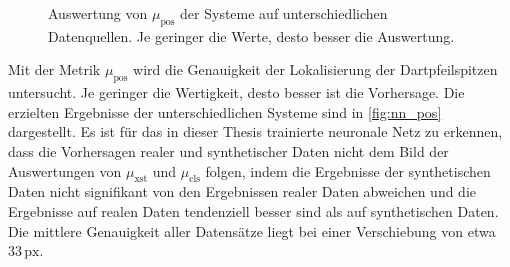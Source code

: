 \begin{figure}
    \centering
    \caption{Auswertung von $\mu_\text{pos}$ der Systeme auf unterschiedlichen Datenquellen. Je geringer die Werte, desto besser die Auswertung.}
    \label{fig:nn_pos}
\end{figure}

Mit der Metrik $\mu_\text{pos}$ wird die Genauigkeit der Lokalisierung der Dartpfeilspitzen untersucht. Je geringer die Wertigkeit, desto besser ist die Vorhersage. Die erzielten Ergebnisse der unterschiedlichen Systeme sind in \autoref{fig:nn_pos} dargestellt. Es ist für das in dieser Thesis trainierte neuronale Netz zu erkennen, dass die Vorhersagen realer und synthetischer Daten nicht dem Bild der Auswertungen von $\mu_\text{xst}$ und $\mu_\text{cls}$ folgen, indem die Ergebnisse der synthetischen Daten nicht signifikant von den Ergebnissen realer Daten abweichen und die Ergebnisse auf realen Daten tendenziell besser sind als auf synthetischen Daten. Die mittlere Genauigkeit aller Datensätze liegt bei einer Verschiebung von etwa $33\,\text{px}$.

